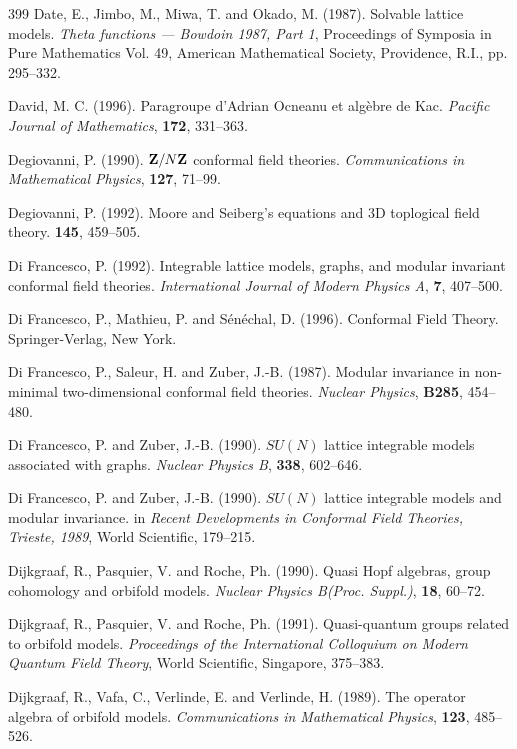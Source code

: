 \documentclass[12pt]{article}
\theoremstyle{plain}
\theoremstyle{definition}
\numberwithin{equation}{section}
\begin{document}
\begin{thebibliography} {399}
Date, E., Jimbo, M., Miwa, T. and Okado, M. (1987).
Solvable lattice models.
{\em Theta functions --- Bowdoin 1987, Part 1},
Proceedings of Symposia in Pure
Mathematics Vol. 49, American Mathematical Society,
Providence, R.I., pp. 295--332.

David, M. C.  (1996).
Paragroupe d'Adrian Ocneanu et alg\`ebre de Kac.
{\em Pacific Journal of Mathematics}, {\bf 172}, 331--363.

Degiovanni, P. (1990).
${\bf Z}/N{\bf Z}$ conformal field theories.
{\em Communications in Mathematical Physics},
{\bf 127}, 71--99.

Degiovanni, P. (1992).
Moore and Seiberg's equations and 3D toplogical field theory.
{\bf 145}, 459--505.

Di Francesco, P. (1992).
Integrable lattice models, graphs, and modular 
invariant conformal field theories.
{\em International Journal of Modern Physics A},
{\bf 7}, 407--500.

Di Francesco, P., Mathieu, P. and S\'en\'echal, D. (1996).
Conformal Field Theory.
Springer-Verlag, New York.

Di Francesco, P., Saleur, H. and Zuber, J.-B. (1987).
Modular invariance in non-minimal two-dimensional conformal field
theories.
{\em Nuclear Physics}, {\bf B285}, 454--480.

Di Francesco, P. and Zuber, J.-B. (1990).
$SU(N)$ lattice integrable models associated with graphs.
{\em Nuclear Physics B}, {\bf 338}, 602--646.

Di Francesco, P. and Zuber, J.-B. (1990).
$SU(N)$ lattice integrable models and modular invariance.
in {\em Recent Developments in Conformal Field Theories, Trieste, 1989}, 
World Scientific, 179--215.

Dijkgraaf, R., Pasquier, V. and Roche, Ph. (1990).
Quasi Hopf algebras, group cohomology and orbifold models. 
{\em Nuclear Physics B(Proc. Suppl.)}, {\bf 18}, 60--72.

Dijkgraaf, R., Pasquier, V. and Roche, Ph. (1991).
Quasi-quantum groups related to orbifold models.
{\em Proceedings of the International Colloquium on
Modern Quantum Field Theory}, World Scientific, 
Singapore, 375--383.

Dijkgraaf, R., Vafa, C., Verlinde, E. and Verlinde, 
H. (1989). The operator algebra of orbifold models.
{\em Communications in Mathematical Physics},  {\bf 123}, 485--526.


\end{thebibliography}
\end{document}
